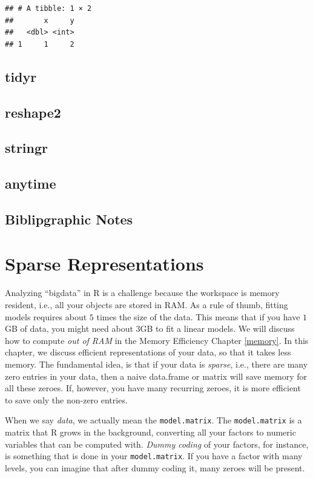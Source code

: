 \documentclass[]{book}
\theoremstyle{definition}
\theoremstyle{definition}
\theoremstyle{remark}
\begin{document}
\begin{verbatim}
## # A tibble: 1 × 2
##       x     y
##   <dbl> <int>
## 1     1     2
\end{verbatim}

\section{tidyr}\label{tidyr}

\section{reshape2}\label{reshape2}

\section{stringr}\label{stringr}

\section{anytime}\label{anytime}

\section{Biblipgraphic Notes}\label{biblipgraphic-notes-1}

\chapter{Sparse Representations}\label{sparse}

Analyzing ``bigdata'' in R is a challenge because the workspace is
memory resident, i.e., all your objects are stored in RAM. As a rule of
thumb, fitting models requires about \(5\) times the size of the data.
This means that if you have \(1\)GB of data, you might need about
\(3\)GB to fit a linear models. We will discuss how to compute \emph{out
of RAM} in the Memory Efficiency Chapter \ref{memory}. In this chapter,
we discuss efficient representations of your data, so that it takes less
memory. The fundamental idea, is that if your data is \emph{sparse},
i.e., there are many zero entries in your data, then a naive data.frame
or matrix will save memory for all these zeroes. If, however, you have
many recurring zeroes, it is more efficient to save only the non-zero
entries.

When we say \emph{data}, we actually mean the \texttt{model.matrix}. The
\texttt{model.matrix} is a matrix that R grows in the background,
converting all your factors to numeric variables that can be computed
with. \emph{Dummy coding} of your factors, for instance, is something
that is done in your \texttt{model.matrix}. If you have a factor with
many levels, you can imagine that after dummy coding it, many zeroes
will be present.
\end{document}
